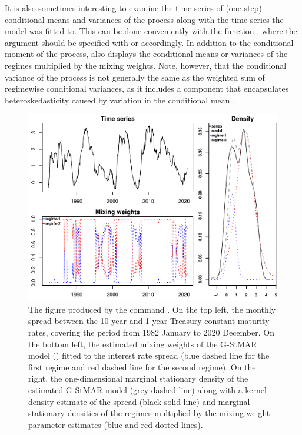 \documentclass[nojss]{jss} %
\begin{document}
It is also sometimes interesting to examine the time series of (one-step) conditional means and variances of the process along with the time series the model was fitted to. This can be done conveniently with the function , where the argument  should be specified with  or  accordingly. In addition to the conditional moment of the process,  also displays the conditional means or variances of the regimes multiplied by the mixing weights. Note, however, that the conditional variance of the process is not generally the same as the weighted sum of regimewise conditional variances, as it includes a component that encapsulates heteroskedasticity caused by variation in the conditional mean \cite[see][Equation (2.19)]{Virolainen:2020}.

\begin{figure}[t]
  \centering
  \includegraphics{figures/plotfit42gs.pdf}
  \caption{The figure produced by the command . On the top left, the monthly spread between the 10-year and 1-year Treasury constant maturity rates, covering the period from 1982 January to 2020 December. On the bottom left, the estimated mixing weights of the G-StMAR model () fitted to the interest rate spread (blue dashed line for the first regime and red dashed line for the second regime). On the right, the one-dimensional marginal stationary density of the estimated G-StMAR model (grey dashed line) along with a kernel density estimate of the spread (black solid line) and marginal stationary densities of the regimes multiplied by the mixing weight parameter estimates (blue and red dotted lines).}
\label{fig:fit42gs}
\end{figure}
\end{document}
